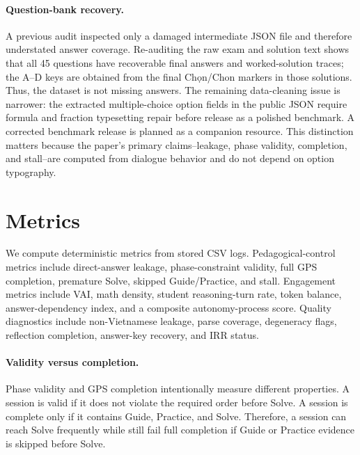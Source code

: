 \documentclass[11pt]{article}
\newcommand{\viet}[1]{{\microtypesetup{protrusion=false,expansion=false}\fontencoding{T5}\selectfont #1}}
\begin{document}
\paragraph{Question-bank recovery.} A previous audit inspected only a damaged intermediate JSON file and therefore understated answer coverage. Re-auditing the raw exam and solution text shows that all 45 questions have recoverable final answers and worked-solution traces; the A--D keys are obtained from the final \viet{Chọn}/Chon markers in those solutions. Thus, the dataset is not missing answers. The remaining data-cleaning issue is narrower: the extracted multiple-choice option fields in the public JSON require formula and fraction typesetting repair before release as a polished benchmark. A corrected benchmark release is planned as a companion resource. This distinction matters because the paper's primary claims--leakage, phase validity, completion, and stall--are computed from dialogue behavior and do not depend on option typography.

\section{Metrics}
We compute deterministic metrics from stored CSV logs. Pedagogical-control metrics include direct-answer leakage, phase-constraint validity, full GPS completion, premature Solve, skipped Guide/Practice, and stall. Engagement metrics include VAI, math density, student reasoning-turn rate, token balance, answer-dependency index, and a composite autonomy-process score. Quality diagnostics include non-Vietnamese leakage, parse coverage, degeneracy flags, reflection completion, answer-key recovery, and IRR status.

\paragraph{Validity versus completion.} Phase validity and GPS completion intentionally measure different properties. A session is valid if it does not violate the required order before Solve. A session is complete only if it contains Guide, Practice, and Solve. Therefore, a session can reach Solve frequently while still fail full completion if Guide or Practice evidence is skipped before Solve.
\end{document}
